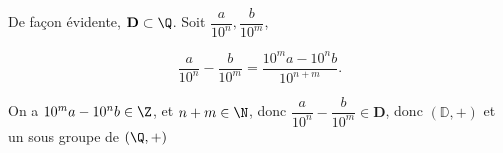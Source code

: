  
De façon évidente, $\mathbf D \subset \Q$. Soit $\dfrac{a}{10^n}, \dfrac{b}{10^m}$,

\[\dfrac{a}{10^n} - \dfrac{b}{10^m} = \dfrac{10^ma - 10^nb}{10^{n+m}}. \]


On a $10^ma - 10^nb \in \Z$, et $n+m \in \N$, donc $\dfrac{a}{10^n} - \dfrac{b}{10^m} \in \mathbf{D}$, donc 
$(\mathbb{D}, +)$ et un sous groupe de $( \Q, +)$